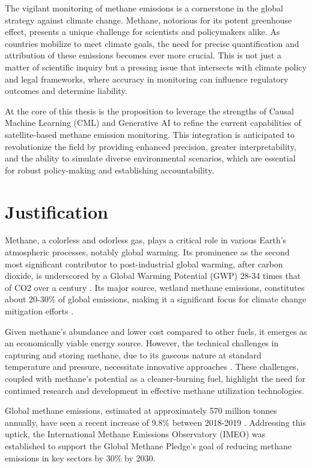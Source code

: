The vigilant monitoring of methane emissions is a cornerstone in the global strategy against climate change. Methane, notorious for its potent greenhouse effect, presents a unique challenge for scientists and policymakers alike. As countries mobilize to meet climate goals, the need for precise quantification and attribution of these emissions becomes ever more crucial. This is not just a matter of scientific inquiry but a pressing issue that intersects with climate policy and legal frameworks, where accuracy in monitoring can influence regulatory outcomes and determine liability.

At the core of this thesis is the proposition to leverage the strengths of Causal Machine Learning (CML) and Generative AI to refine the current capabilities of satellite-based methane emission monitoring. This integration is anticipated to revolutionize the field by providing enhanced precision, greater interpretability, and the ability to simulate diverse environmental scenarios, which are essential for robust policy-making and establishing accountability.


\section{Justification}

Methane, a colorless and odorless gas, plays a critical role in various Earth's atmospheric processes, notably global warming. Its prominence as the second most significant contributor to post-industrial global warming, after carbon dioxide, is underscored by a Global Warming Potential (GWP) 28-34 times that of CO2 over a century \cite{tian_catalytic_2021, IPCC2013}. Its major source, wetland methane emissions, constitutes about 20-30\% of global emissions, making it a significant focus for climate change mitigation efforts \cite{bousquet_contribution_2006, chen_estimation_2006}.

Given methane's abundance and lower cost compared to other fuels, it emerges as an economically viable energy source. However, the technical challenges in capturing and storing methane, due to its gaseous nature at standard temperature and pressure, necessitate innovative approaches \cite{cardenas_is_1996, rajnauth_monetizing_2008}. These challenges, coupled with methane's potential as a cleaner-burning fuel, highlight the need for continued research and development in effective methane utilization technologies.

Global methane emissions, estimated at approximately 570 million tonnes annually, have seen a recent increase of 9.8\% between 2018-2019 \cite{stocker2014climate, friedlingstein2020global}. Addressing this uptick, the International Methane Emissions Observatory (IMEO) was established to support the Global Methane Pledge's goal of reducing methane emissions in key sectors by 30\% by 2030.

